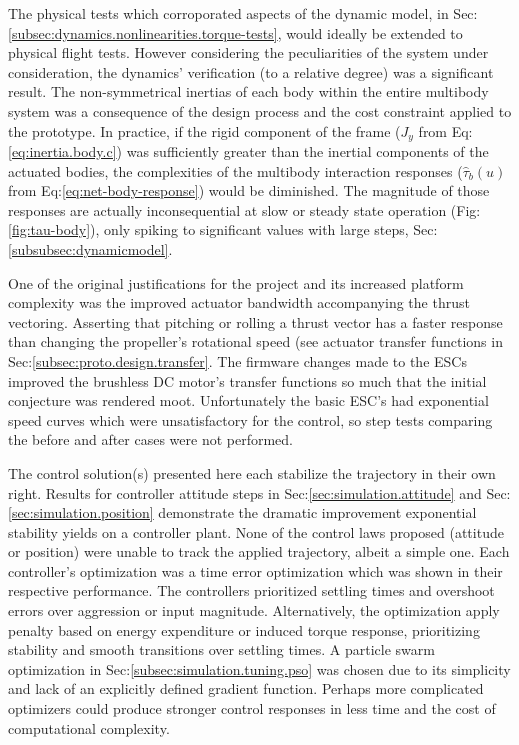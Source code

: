 The physical tests which corroporated aspects of the dynamic model, in Sec:\ref{subsec:dynamics.nonlinearities.torque-tests}, would ideally be extended to physical flight tests. However considering the peculiarities of the system under consideration, the dynamics' verification (to a relative degree) was a significant result. The non-symmetrical inertias of each body within the entire multibody system was a consequence of the design process and the cost constraint applied to the prototype. In practice, if the rigid component of the frame ($J_y$ from Eq:\ref{eq:inertia.body.c}) was sufficiently greater than the inertial components of the actuated bodies, the complexities of the multibody interaction responses ($\hat{\tau}_b(u)$ from Eq:\ref{eq:net-body-response}) would be diminished. The magnitude of those responses are actually inconsequential at slow or steady state operation (Fig:\ref{fig:tau-body}), only spiking to significant values with large steps, Sec:\ref{subsubsec:dynamicmodel}.
\par
One of the original justifications for the project and its increased platform complexity was the improved actuator bandwidth accompanying the thrust vectoring. Asserting that pitching or rolling a thrust vector has a faster response than changing the propeller's rotational speed (see actuator transfer functions in Sec:\ref{subsec:proto.design.transfer}. The firmware changes made to the ESCs improved the brushless DC motor's transfer functions so much that the initial conjecture was rendered moot. Unfortunately the basic ESC's had exponential speed curves which were unsatisfactory for the control, so step tests comparing the before and after cases were not performed.
\par
The control solution(s) presented here each stabilize the trajectory in their own right. Results for controller attitude steps in Sec:\ref{sec:simulation.attitude} and Sec:\ref{sec:simulation.position} demonstrate the dramatic improvement exponential stability yields on a controller plant. None of the control laws proposed (attitude or position) were unable to track the applied trajectory, albeit a simple one. Each controller's optimization was a time error optimization which was shown in their respective performance. The controllers prioritized settling times and overshoot errors over aggression or input magnitude. Alternatively, the optimization apply penalty based on energy expenditure or induced torque response, prioritizing stability and smooth transitions over settling times. 
A particle swarm optimization in Sec:\ref{subsec:simulation.tuning.pso} was chosen due to its simplicity and lack of an explicitly defined gradient function. Perhaps more complicated optimizers could produce stronger control responses in less time and the cost of computational complexity.
